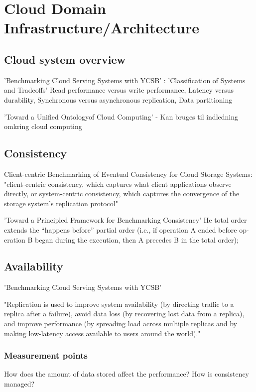 \chapter{Cloud Domain Infrastructure/Architecture}

\section{Cloud system overview}
'Benchmarking Cloud Serving Systems with YCSB' : 'Classification of Systems and Tradeoffs'
Read performance versus write performance, Latency versus durability, Synchronous versus asynchronous replication, Data partitioning


'Toward a Unified Ontologyof Cloud Computing' - Kan bruges til indledning omkring cloud computing

\section{Consistency}
Client-centric Benchmarking of Eventual Consistency for Cloud Storage Systems: "client-centric consistency, which captures what client applications observe directly, or system-centric consistency, which captures the convergence of the storage system’s replication protocol"

'Toward a Principled Framework for Benchmarking Consistency'
He total order extends the “happens before” partial order (i.e., if operation A ended before op- eration B began during the execution, then A precedes B in the total order);

\section{Availability}
'Benchmarking Cloud Serving Systems with YCSB'

"Replication is used to improve system availability (by directing traffic to a replica after a failure), avoid data loss (by recovering lost data from a replica), and improve performance (by spreading load across multiple replicas and by making low-latency access available to users around the world)."




\subsection{Measurement points}
How does the amount of data stored affect the performance?
How is consistency managed?


